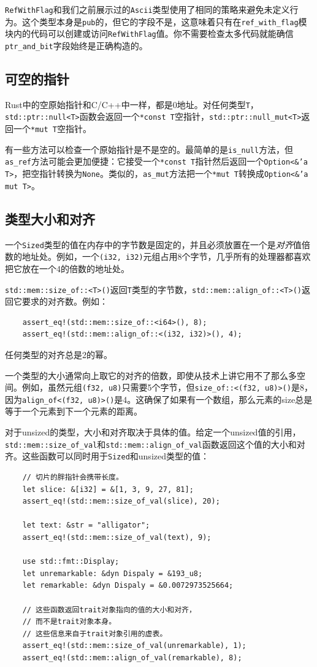 \texttt{RefWithFlag}和我们之前展示过的\texttt{Ascii}类型使用了相同的策略来避免未定义行为。这个类型本身是\texttt{pub}的，但它的字段不是，这意味着只有在\texttt{ref\_with\_flag}模块内的代码可以创建或访问\texttt{RefWithFlag}值。你不需要检查太多代码就能确信\texttt{ptr\_and\_bit}字段始终是正确构造的。

\subsection{可空的指针}
Rust中的空原始指针和C/C++中一样，都是0地址。对任何类型\texttt{T}，\texttt{std::ptr::null<T>}函数会返回一个\texttt{*const T}空指针，\texttt{std::ptr::null\_mut<T>}返回一个\texttt{*mut T}空指针。

有一些方法可以检查一个原始指针是不是空的。最简单的是\texttt{is\_null}方法，但\texttt{as\_ref}方法可能会更加便捷：它接受一个\texttt{*const T}指针然后返回一个\texttt{Option<\&'a T>}，把空指针转换为\texttt{None}。类似的，\texttt{as\_mut}方法把一个\texttt{*mut T}转换成\texttt{Option<\&'a mut T>}。

\subsection{类型大小和对齐}
一个\texttt{Sized}类型的值在内存中的字节数是固定的，并且必须放置在一个是\emph{对齐}值倍数的地址处。例如，一个\texttt{(i32, i32)}元组占用8个字节，几乎所有的处理器都喜欢把它放在一个4的倍数的地址处。

\texttt{std::mem::size\_of::<T>()}返回\texttt{T}类型的字节数，\texttt{std::mem::align\_of::<T>()}返回它要求的对齐数。例如：
\begin{verbatim}
    assert_eq!(std::mem::size_of::<i64>(), 8);
    assert_eq!(std::mem::align_of::<(i32, i32)>(), 4);
\end{verbatim}

任何类型的对齐总是2的幂。

一个类型的大小通常向上取它的对齐的倍数，即使从技术上讲它用不了那么多空间。例如，虽然元组\texttt{(f32, u8)}只需要5个字节，但\texttt{size\_of::<(f32, u8)>()}是8，因为\texttt{align\_of<(f32, u8)>()}是4。这确保了如果有一个数组，那么元素的size总是等于一个元素到下一个元素的距离。

对于unsized的类型，大小和对齐取决于具体的值。给定一个unsized值的引用，\\
\texttt{std::mem::size\_of\_val}和\texttt{std::mem::align\_of\_val}函数返回这个值的大小和对齐。这些函数可以同时用于\texttt{Sized}和unsized类型的值：
\begin{verbatim}
    // 切片的胖指针会携带长度。
    let slice: &[i32] = &[1, 3, 9, 27, 81];
    assert_eq!(std::mem::size_of_val(slice), 20);

    let text: &str = "alligator";
    assert_eq!(std::mem::size_of_val(text), 9);

    use std::fmt::Display;
    let unremarkable: &dyn Dispaly = &193_u8;
    let remarkable: &dyn Dispaly = &0.0072973525664;

    // 这些函数返回trait对象指向的值的大小和对齐，
    // 而不是trait对象本身。
    // 这些信息来自于trait对象引用的虚表。
    assert_eq!(std::mem::size_of_val(unremarkable), 1);
    assert_eq!(std::mem::align_of_val(remarkable), 8);
\end{verbatim}


